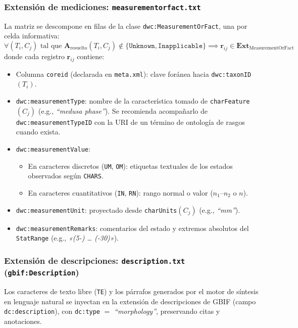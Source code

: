 \documentclass[11pt,a4paper]{article}
\theoremstyle{definition}
\theoremstyle{remark}
\begin{document}
\subsubsection{Extensión de mediciones: \texttt{measurementorfact.txt}}
La matriz se descompone en filas de la clase \texttt{dwc:MeasurementOrFact}, una por celda informativa:
\begin{equation}
\forall (T_i, C_j) \text{ tal que } \mathbf{A}_{\text{resuelto}}(T_i, C_j) \notin \{\texttt{Unknown}, \texttt{Inapplicable}\} \implies \mathbf{r}_{ij} \in \mathbf{Ext}_{\text{MeasurementOrFact}}
\end{equation}
donde cada registro $\mathbf{r}_{ij}$ contiene:
\begin{itemize}
    \item Columna \texttt{coreid} (declarada en \texttt{meta.xml}): clave foránea hacia \texttt{dwc:taxonID}$(T_i)$.
    \item \texttt{dwc:measurementType}: nombre de la característica tomado de \texttt{charFeature}$(C_j)$ (e.g., \textit{``medusa phase''}). Se recomienda acompañarlo de \texttt{dwc:measurementTypeID} con la URI de un término de ontología de rasgos cuando exista.
    \item \texttt{dwc:measurementValue}:
      \begin{itemize}
          \item En caracteres discretos (\texttt{UM}, \texttt{OM}): etiquetas textuales de los estados observados según \texttt{CHARS}.
          \item En caracteres cuantitativos (\texttt{IN}, \texttt{RN}): rango normal o valor ($n_1$--$n_2$ o $n$).
      \end{itemize}
    \item \texttt{dwc:measurementUnit}: proyectado desde \texttt{charUnits}$(C_j)$ (e.g., \textit{``mm''}).
    \item \texttt{dwc:measurementRemarks}: comentarios del estado y extremos absolutos del \texttt{StatRange} (e.g., \textit{«(5-) \dots{} (-30)»}).
\end{itemize}

\subsubsection{Extensión de descripciones: \texttt{description.txt} (\texttt{gbif:Description})}
Los caracteres de texto libre (\texttt{TE}) y los párrafos generados por el motor de síntesis en lenguaje natural se inyectan en la extensión de descripciones de GBIF (campo \texttt{dc:description}), con \texttt{dc:type} $=$ \textit{``morphology''}, preservando citas y anotaciones.
\end{document}
